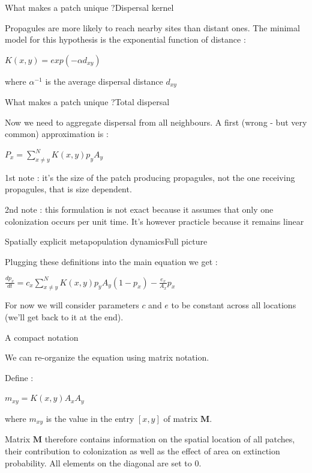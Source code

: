 \documentclass[10pt,aspectratio=149]{beamer}
\newcommand{\keyeq}[1]{%
  \begin{center}
    \Large$\displaystyle #1$
  \end{center}%
}
\begin{document}

\begin{frame}{What makes a patch unique ?}{Dispersal kernel}

	Propagules are more likely to reach nearby sites than distant ones. The minimal model for this hypothesis is the exponential function of distance :

    \keyeq{K(x,y)=exp(-\alpha d_{xy})}

    where $\alpha^{-1}$ is the average dispersal distance $d_{xy}$

\end{frame}


\begin{frame}{What makes a patch unique ?}{Total dispersal}

	Now we need to aggregate dispersal from all neighbours. A first (wrong - but very common) approximation is : 
    
       \keyeq{P_x = \sum_{x\neq y}^N K(x,y)p_yA_y}
    
    1st note : it's the size of the patch producing propagules, not the one receiving propagules, that is size dependent.

    2nd note : this formulation is not exact because it assumes that only one colonization occurs per unit time. It's however practicle because it remains linear

\end{frame}


\begin{frame}{Spatially explicit metapopulation dynamics}{Full picture}

	Plugging these definitions into the main equation we get : 

    \keyeq{\frac{dp_x}{dt} = c_x \sum_{x\neq y}^N K(x,y)p_yA_y (1-p_x) - \frac{e_x}{A_x}p_x}
    
    For now we will consider parameters $c$ and $e$ to be constant across all locations (we'll get back to it at the end). 

\end{frame}


\begin{frame}{A compact notation}

	We can re-organize the equation using matrix notation. 

    Define : 

    \keyeq{m_{xy} = K(x,y)A_xA_y}

    where $m_{xy}$ is the value in the entry $[x,y]$ of matrix $\mathbf{M}$. 

    Matrix $\mathbf{M}$ therefore contains information on the spatial location of all patches, their contribution to colonization as well as the effect of area on extinction probability. All elements on the diagonal are set to 0. 

\end{frame}
\end{document}
